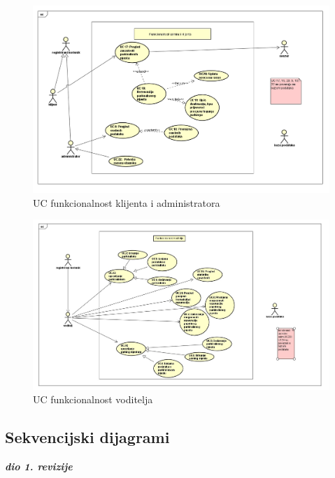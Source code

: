 \begin{packed_item}
                    \begin{figure}[H]
						\includegraphics[width=\textwidth]{slike/klijent.PNG} %
						\caption{UC funkcionalnost klijenta i administratora}
						\label{fig:klijent}
					\end{figure}
				
				   \begin{figure}[H]
				   	\includegraphics[width=\textwidth]{slike/Voditelj.jpeg} %
				   	\caption{UC funkcionalnost voditelja}
				   	\label{fig:voditelj}
				   \end{figure}
				\eject		

				
			\subsection{Sekvencijski dijagrami}
				
				\textbf{\textit{dio 1. revizije}}\\
				

\end{packed_item}
